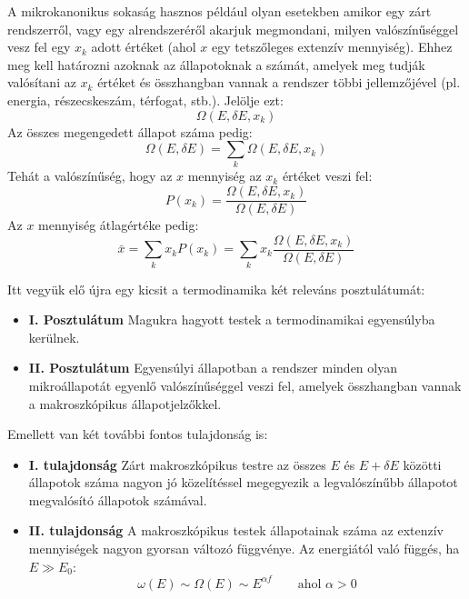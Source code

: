 \documentclass[../main.tex]{subfiles}
\begin{document}
A mikrokanonikus sokaság hasznos például olyan esetekben amikor egy zárt rendszerről, vagy egy alrendszeréről akarjuk megmondani, milyen valószínűséggel vesz fel egy $x_k$ adott értéket (ahol $x$ egy tetszőleges extenzív mennyiség).
Ehhez meg kell határozni azoknak az állapotoknak a számát, amelyek meg tudják valósítani az $x_k$ értéket és összhangban vannak a rendszer többi jellemzőjével (pl. energia, részecskeszám, térfogat, stb.).
Jelölje ezt:
\begin{equation}
    \Omega(E, \delta E, x_k)
\end{equation}
Az összes megengedett állapot száma pedig:
\begin{equation}
    \Omega(E, \delta E) = \sum_{k} \Omega(E, \delta E, x_k)
\end{equation}
Tehát a valószínűség, hogy az $x$ mennyiség az $x_k$ értéket veszi fel:
\begin{equation}
    P(x_k) = \frac{\Omega(E, \delta E, x_k)}{\Omega(E, \delta E)}
\end{equation}
Az $x$ mennyiség átlagértéke pedig:
\begin{equation}
    \bar{x} = \sum_k x_k P(x_k) = \sum_k x_k \frac{\Omega(E, \delta E, x_k)}{\Omega(E, \delta E)}
\end{equation}

Itt vegyük elő újra egy kicsit a termodinamika két releváns posztulátumát:
\begin{itemize}
    \item \textbf{I. Posztulátum} Magukra hagyott testek a termodinamikai egyensúlyba kerülnek.
    \item \textbf{II. Posztulátum} Egyensúlyi állapotban a rendszer minden olyan mikroállapotát egyenlő valószínűséggel veszi fel, amelyek összhangban vannak a makroszkópikus állapotjelzőkkel.
\end{itemize}

Emellett van két további fontos tulajdonság is:
\begin{itemize}
    \item \textbf{I. tulajdonság} Zárt makroszkópikus testre az összes $E$ és $E + \delta E$ közötti állapotok száma nagyon jó közelítéssel megegyezik a legvalószínűbb állapotot megvalósító állapotok számával.
    \item \textbf{II. tulajdonság} A makroszkópikus testek állapotainak száma az extenzív mennyiségek nagyon gyorsan változó függvénye. Az energiától való függés, ha $E \gg E_0$:
    \begin{equation}
        \omega(E) \sim \Omega(E) \sim E^{\alpha f} \qquad \text{ahol } \alpha > 0
    \end{equation}
\end{itemize}
\end{document}
